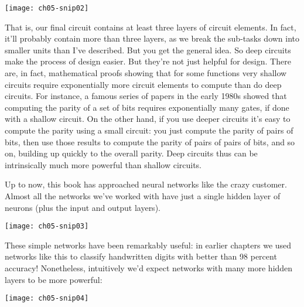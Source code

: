 \begin{figure*}[tph]
    \texttt{[image: ch05-snip02]}
    \label{fig:ch05-snip02}
    \end{figure*}

That is, our final circuit contains at least three layers of circuit elements. In fact, it'll probably contain more than three layers, as we break the sub-tasks down into smaller units than I've described. But you get the general idea.
So deep circuits make the process of design easier. But they're not just helpful for design. There are, in fact, mathematical proofs showing that for some functions very shallow circuits require exponentially more circuit elements to compute than do deep circuits. For instance, a famous series of papers in the early 1980s showed that computing the parity of a set of bits requires exponentially many gates, if done with a shallow circuit. On the other hand, if you use deeper circuits it's easy to compute the parity using a small circuit: you just compute the parity of pairs of bits, then use those results to compute the parity of pairs of pairs of bits, and so on, building up quickly to the overall parity. Deep circuits thus can be intrinsically much more powerful than shallow circuits.

Up to now, this book has approached neural networks like the crazy customer. Almost all the networks we've worked with have just a single hidden layer of neurons (plus the input and output layers).


\begin{marginfigure}
    \texttt{[image: ch05-snip03]}
    \end{marginfigure}
    


These simple networks have been remarkably useful: in earlier chapters we used networks like this to classify handwritten digits with better than 98 percent accuracy! Nonetheless, intuitively we'd expect networks with many more hidden layers to be more powerful:

\begin{figure*}[tph]
    \texttt{[image: ch05-snip04]}
    \label{fig:ch05-snip04}
    \end{figure*}


